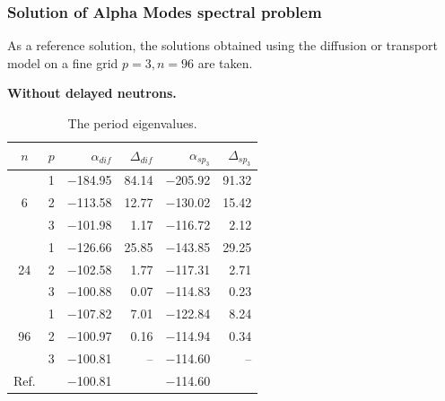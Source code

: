 \documentclass[authoryear]{elsarticle}
\begin{document}
\subsubsection{Solution of Alpha Modes spectral problem}
As a reference solution, the solutions obtained using the diffusion or transport model on a fine grid $ p = 3, n = 96 $ are taken.
 
\textbf{Without delayed neutrons.}


\begin{table}[h]
\caption{The period eigenvalues.}
\label{tab:iaea_with_alpha}
\begin{center}
\begin{tabular}{c c r r r r}
\hline
$n$ & $p$ & $\alpha_{dif}$ & $\Delta_{dif}$ &$\alpha_{sp_3}$& $\Delta_{sp_3}$ \\
\hline
	& 1	& $-$184.95 & 84.14 & $-$205.92 & 91.32\\
6	& 2	& $-$113.58 & 12.77 & $-$130.02 & 15.42\\
	& 3	& $-$101.98 &  1.17 & $-$116.72 &  2.12\\ 
\hline
	& 1	& $-$126.66 & 25.85 & $-$143.85 & 29.25\\
24& 2	& $-$102.58 &  1.77 & $-$117.31 &  2.71\\
	& 3	& $-$100.88 &  0.07 & $-$114.83 &  0.23\\ 
\hline
	& 1	& $-$107.82 &  7.01 & $-$122.84 & 8.24\\
96& 2	& $-$100.97 &  0.16 & $-$114.94 & 0.34\\
	& 3	& $-$100.81 &	 -- & $-$114.60 &  -- \\ 
\hline
Ref.& & $-$100.81 & & $-$114.60 \\ 
\hline
\end{tabular}
\end{center}
\end{table}
\end{document}
